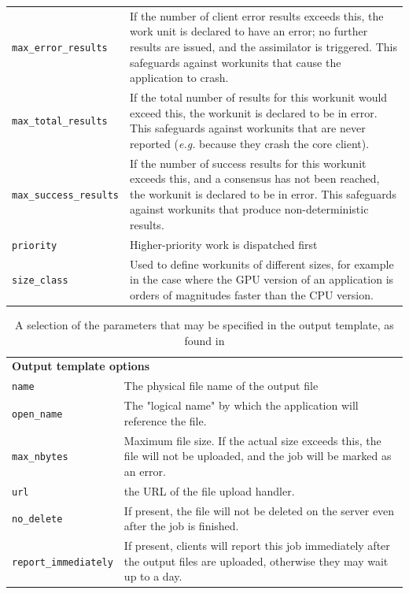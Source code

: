 \begin{table}
\begin{tabular}{lp{11.5cm}}
\verb|max_error_results| &
If the number of client error results exceeds this, the work unit is declared to have an error; no further results are issued, and the assimilator is triggered. This safeguards against workunits that cause the application to crash.
\\
\verb|max_total_results| & If the total number of results for this workunit would exceed this, the workunit is declared to be in error. This safeguards against workunits that are never reported (\emph{e.g.} because they crash the core client).
\\
\verb|max_success_results| & If the number of success results for this workunit exceeds this, and a consensus has not been reached, the workunit is declared to be in error. This safeguards against workunits that produce non-deterministic results.
\\
\verb|priority| &  Higher-priority work is dispatched first \\
\verb|size_class| & Used to define workunits of different sizes, for example in the case where the GPU version of an application is orders of magnitudes faster than the CPU version. \\ \bottomrule
\end{tabular} \label{tab:intemplate}
\end{table}

\begin{table} 
\caption{A selection of the parameters that may be specified in the output template, as found in \cite{boincwiki}}
\begin{tabular}{lp{11.6cm}}\toprule
 \multicolumn{2}{l}{\textbf{Output template options} \cite{boincwiki}   }\\ \cmidrule(r){1-2}
 \verb|name| & The physical file name of the output file\\
\verb|open_name| & The "logical name" by which the application will reference the file.\\
\verb|max_nbytes| & Maximum file size. If the actual size exceeds this, the file will not be uploaded, and the job will be marked as an error.\\
\verb|url| & the URL of the file upload handler. \\ 
\verb|no_delete| & If present, the file will not be deleted on the server even after the job is finished.\\
\verb|report_immediately| & If present, clients will report this job immediately after the output files are uploaded, otherwise they may wait up to a day. 
\\  \bottomrule
\end{tabular}\label{tab:outtemplate}
\end{table}

